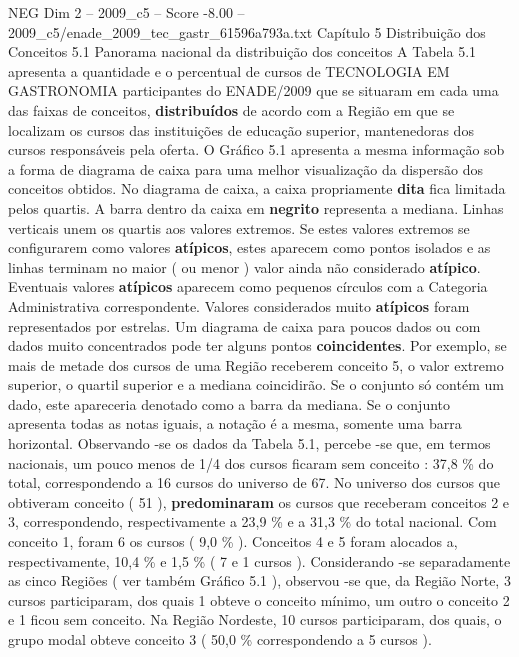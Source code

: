 \begin{textsample}{NEG Dim 2 – 2009\_c5 – Score -8.00 – 2009\_c5/enade\_2009\_tec\_gastr\_61596a793a.txt}  \label{ex:f2_neg_019}
Capítulo 5 Distribuição dos Conceitos 5.1 Panorama nacional da distribuição dos conceitos A Tabela 5.1 apresenta a quantidade e o percentual de cursos de TECNOLOGIA EM GASTRONOMIA participantes do ENADE/2009 que se situaram em cada uma das faixas de conceitos, \textbf{distribuídos} de acordo com a Região em que se localizam os cursos das instituições de educação superior, mantenedoras dos cursos responsáveis pela oferta.
O Gráfico 5.1 apresenta a mesma informação sob a forma de diagrama de caixa para uma melhor visualização da dispersão dos conceitos obtidos.
No diagrama de caixa, a caixa propriamente \textbf{dita} fica limitada pelos quartis.
A barra dentro da caixa em \textbf{negrito} representa a mediana.
Linhas verticais unem os quartis aos valores extremos.
Se estes valores extremos se configurarem como valores \textbf{atípicos}, estes aparecem como pontos isolados e as linhas terminam no maior ( ou menor ) valor ainda não considerado \textbf{atípico}.
Eventuais valores \textbf{atípicos} aparecem como pequenos círculos com a Categoria Administrativa correspondente.
Valores considerados muito \textbf{atípicos} foram representados por estrelas.
Um diagrama de caixa para poucos dados ou com dados muito concentrados pode ter alguns pontos \textbf{coincidentes}.
Por exemplo, se mais de metade dos cursos de uma Região receberem conceito 5, o valor extremo superior, o quartil superior e a mediana coincidirão.
Se o conjunto só contém um dado, este apareceria denotado como a barra da mediana.
Se o conjunto apresenta todas as notas iguais, a notação é a mesma, somente uma barra horizontal.
Observando -se os dados da Tabela 5.1, percebe -se que, em termos nacionais, um pouco menos de 1/4 dos cursos ficaram sem conceito : 37,8 \% do total, correspondendo a 16 cursos do universo de 67.
No universo dos cursos que obtiveram conceito ( 51 ), \textbf{predominaram} os cursos que receberam conceitos 2 e 3, correspondendo, respectivamente a 23,9 \% e a 31,3 \% do total nacional.
Com conceito 1, foram 6 os cursos ( 9,0 \% ).
Conceitos 4 e 5 foram alocados a, respectivamente, 10,4 \% e 1,5 \% ( 7 e 1 cursos ).
Considerando -se separadamente as cinco Regiões ( ver também Gráfico 5.1 ), observou -se que, da Região Norte, 3 cursos participaram, dos quais 1 obteve o conceito mínimo, um outro o conceito 2 e 1 ficou sem conceito.
Na Região Nordeste, 10 cursos participaram, dos quais, o grupo modal obteve conceito 3 ( 50,0 \% correspondendo a 5 cursos ).

\end{textsample}
